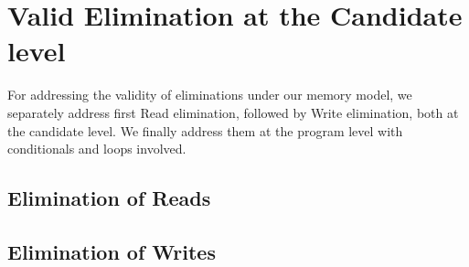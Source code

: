 \section{Valid Elimination at the Candidate level}

    For addressing the validity of eliminations under our memory model, we separately address first Read elimination, followed by Write elimination, both at the candidate level. 
    We finally address them at the program level with conditionals and loops involved. 
    \subsection{Elimination of Reads}
        

    \subsection{Elimination of Writes}
        
    